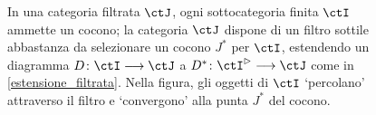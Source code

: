 \begin{figure}
\begin{center}
 \end{center}
 \caption{In una categoria filtrata \(\ctJ\), ogni sottocategoria finita \(\ctI\) ammette un cocono; la categoria \(\ctJ\) dispone di un filtro sottile abbastanza da selezionare un cocono \(J^*\) per \(\ctI\), estendendo un diagramma \(D \colon \ctI \fun\ctJ\) a \(D^* \colon \ctI^\rhd \fun \ctJ\) come in \ref{estensione_filtrata}. Nella figura, gli oggetti di \(\ctI\) `percolano' attraverso il filtro e `convergono' alla punta \(J^*\) del cocono.}
 \label{fig_filtro_setaccio}
\end{figure}
